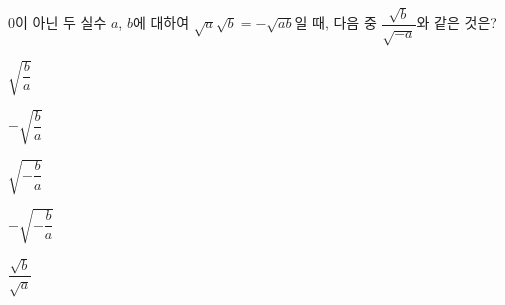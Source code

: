 $0$이 아닌 두 실수 $a$, $b$에 대하여 $\sqrt{a}\sqrt{b}=-\sqrt{ab}$일 때, 다음 중 $\dfrac{\sqrt{b}}{\sqrt{-a}}$와 같은 것은?
\begin{choices32}{\rule[-3ex]{0pt}{8ex}$\sqrt{\dfrac{b}{a}}$}{\rule[-3ex]{0pt}{8ex}$-\sqrt{\dfrac{b}{a}}$}{\rule[-3ex]{0pt}{8ex}$\sqrt{-\dfrac{b}{a}}$}{\rule[-3ex]{0pt}{8ex}$-\sqrt{-\dfrac{b}{a}}$}{\rule[-3ex]{0pt}{8ex}$\dfrac{\sqrt{b}}{\sqrt{a}}$}\end{choices32}
